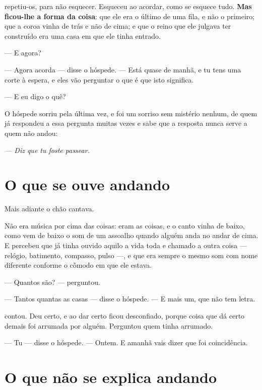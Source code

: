 \documentclass[livro.tex]{subfiles}
\begin{document}
\medskip
\noindent \Ben repetiu-os, para não esquecer. Esqueceu ao acordar, como se
esquece tudo. \textbf{Mas ficou-lhe a forma da coisa}: que ele era o último de
uma fila, e não o primeiro; que a coroa vinha de trás e não de cima; e que o
reino que ele julgava ter construído era uma casa em que ele tinha entrado.

\medskip
\noindent --- E agora?

--- Agora acorda --- disse o hóspede. --- Está quase de manhã, e tu tens uma
corte à espera, e eles vão perguntar o que é que isto significa.

\medskip
\noindent --- E eu digo o quê?

\medskip
\noindent O hóspede sorriu pela última vez, e foi um sorriso sem mistério
nenhum, de quem já respondeu a essa pergunta muitas vezes e sabe que a resposta
nunca serve a quem não andou:

\begin{center}
\emph{--- Diz que tu foste passear.}
\end{center}

\section{O que se ouve andando}

Mais adiante o chão cantava.

Não era música por cima das coisas: eram as coisas, e o canto vinha de baixo,
como vem de baixo o som de um assoalho quando alguém anda no andar de cima. E
\Ben percebeu que já tinha ouvido aquilo a vida toda e chamado a outra coisa
--- relógio, batimento, compasso, pulso ---, e que era sempre o mesmo som com
nome diferente conforme o cômodo em que ele estava.

\medskip
\noindent --- Quantos são? --- perguntou.

--- Tantos quantas as casas --- disse o hóspede. --- E mais um, que não tem
letra.

\medskip
\noindent \Ben contou. Deu certo, e ao dar certo ficou desconfiado, porque
coisa que dá certo demais foi arrumada por alguém. Perguntou quem tinha
arrumado.

--- Tu --- disse o hóspede. --- Ontem. E amanhã vais dizer que foi
coincidência.

\section{O que não se explica andando}
\end{document}
